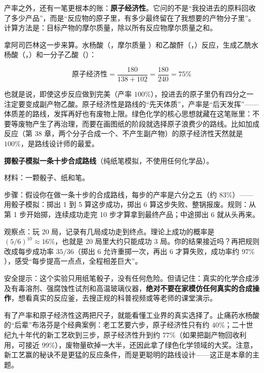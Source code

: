 \begin{qiaoliang}
产率之外，还有一笔更根本的账：\textbf{原子经济性}。它问的不是“我投进去的原料回收了多少产品”，而是“反应物的原子里，有多少最终留在了我想要的产物分子里”。计算方法是：目标产物的摩尔质量，除以所有反应物摩尔质量之和。

拿阿司匹林这一步来算。水杨酸（，摩尔质量 ）和乙酸酐（，）反应，生成乙酰水杨酸（，）和一分子乙酸（）：

\[\text{原子经济性}=\frac{180}{138+102}=\frac{180}{240}=75\%\]

也就是说，即使这步反应做到完美（产率 $100\%$），投进去的原子里仍有四分之一注定要变成副产物乙酸。原子经济性是路线的“先天体质”，产率是“后天发挥”——体质差的路线，发挥再好也有废物上限。绿色化学的核心思想就藏在这笔账里：不要等废物产生了再治理，而要在画图纸的阶段就选择原子浪费少的路线。比如加成反应（第 38 章，两个分子合成一个、不产生副产物）的原子经济性天然就是 $100\%$，是路线设计师的最爱。
\end{qiaoliang}

\begin{shiyan}
\textbf{掷骰子模拟一条十步合成路线}（纯纸笔模拟，不使用任何化学品）。

材料：一颗骰子、纸和笔。

步骤：假设你在做一条十步的合成路线，每步的产率是六分之五（约 $83\%$）——用骰子模拟：掷出 1 到 5 算这步成功，掷出 6 算这步失败、整锅报废。规则：从第 1 步开始掷，连续成功走完 10 步才算拿到最终产品；中途掷出 6 就从头再来。

观察点：玩 20 局，记录有几局成功走到终点。理论上成功的概率是 $(5/6)^{10}\approx 16\%$，也就是 20 局里大约只能成功 3 局。你的结果接近吗？再把规则改成每步成功率 $35/36$（掷出 6 允许重掷一次，再出 6 才算失败，成功率约 $97\%$），感受“每步提高一点点，全程相差巨大”。

安全提示：这个实验只用纸笔骰子，没有任何危险。但请记住：真实的化学合成涉及有毒溶剂、强腐蚀性试剂和高温玻璃仪器，\textbf{绝对不要在家模仿任何真实的合成操作}，想看真实的反应釜，去搜正规的科普视频或等老师的课堂演示。
\end{shiyan}

有了产率和原子经济性这两把尺子，就能看懂工业界的真实选择了。止痛药水杨酸的“后辈”布洛芬是个经典案例：老工艺要六步，原子经济性只有约 $40\%$；二十世纪九十年代的新工艺砍到三步，原子经济性升到约 $77\%$（如果把副产物回收利用，可接近 $99\%$），废物量砍掉一大半，还因此拿了绿色化学领域的大奖。注意，新工艺赢的秘诀不是更猛的反应条件，而是更聪明的路线设计——这正是本章的主题。

